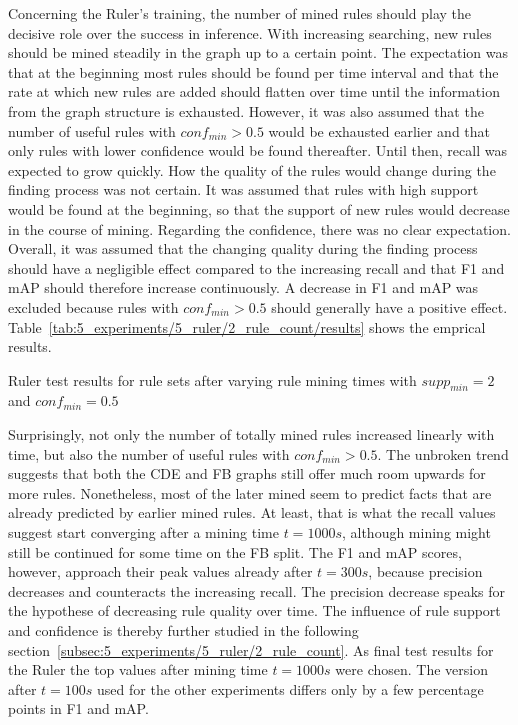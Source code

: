 Concerning the Ruler's training, the number of mined rules should play the decisive role over the success in inference. With increasing searching, new rules should be mined steadily in the graph up to a certain point. The expectation was that at the beginning most rules should be found per time interval and that the rate at which new rules are added should flatten over time until the information from the graph structure is exhausted. However, it was also assumed that the number of useful rules with $conf_{min} > 0.5$ would be exhausted earlier and that only rules with lower confidence would be found thereafter. Until then, recall was expected to grow quickly. How the quality of the rules would change during the finding process was not certain. It was assumed that rules with high support would be found at the beginning, so that the support of new rules would decrease in the course of mining. Regarding the confidence, there was no clear expectation. Overall, it was assumed that the changing quality during the finding process should have a negligible effect compared to the increasing recall and that F1 and mAP should therefore increase continuously. A decrease in F1 and mAP was excluded because rules with $conf_{min} > 0.5$ should generally have a positive effect. Table~\ref{tab:5_experiments/5_ruler/2_rule_count/results} shows the emprical results.

\begin{table}
    \makebox[\textwidth][c]{
        
    }
    \caption{Ruler test results for rule sets after varying rule mining times with $supp_{min} = 2$ and $conf_{min} = 0.5$}
    \label{tab:5_experiments/5_ruler/2_rule_count/results}
\end{table}

Surprisingly, not only the number of totally mined rules increased linearly with time, but also the number of useful rules with $conf_{min} > 0.5$. The unbroken trend suggests that both the CDE and FB graphs still offer much room upwards for more rules. Nonetheless, most of the later mined seem to predict facts that are already predicted by earlier mined rules. At least, that is what the recall values suggest start converging after a mining time $t = 1000s$, although mining might still be continued for some time on the FB split. The F1 and mAP scores, however, approach their peak values already after $t = 300s$, because precision decreases and counteracts the increasing recall. The precision decrease speaks for the hypothese of decreasing rule quality over time. The influence of rule support and confidence is thereby further studied in the following section~\ref{subsec:5_experiments/5_ruler/2_rule_count}. As final test results for the Ruler the top values after mining time $t = 1000s$ were chosen. The version after $t = 100s$ used for the other experiments differs only by a few percentage points in F1 and mAP.
